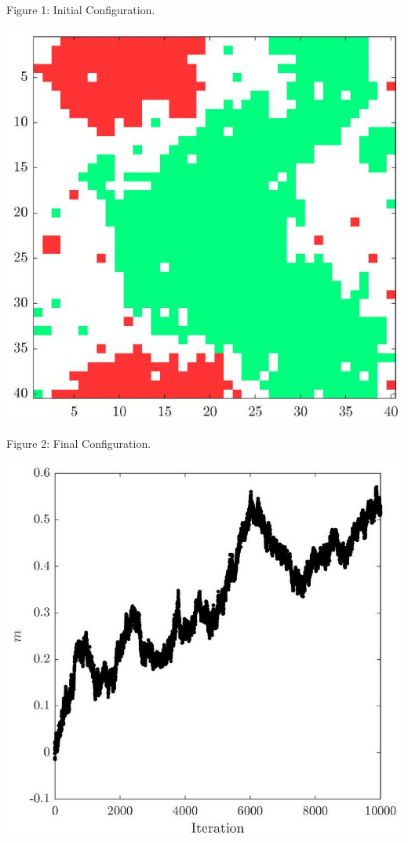 \documentclass[12pt]{article}
\begin{document}
Figure 1: Initial Configuration.

\begin{center}
\includegraphics[max width=\textwidth]{2024_03_02_8c82830fbe70d4921a9fg-4}
\end{center}

Figure 2: Final Configuration.

\begin{center}
\includegraphics[max width=\textwidth]{2024_03_02_8c82830fbe70d4921a9fg-5(1)}
\end{center}
\end{document}
